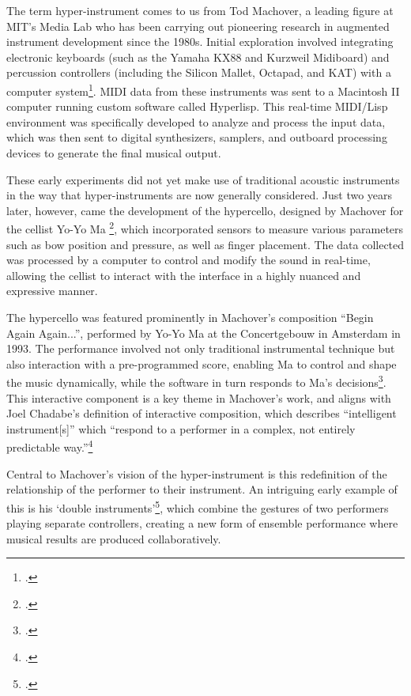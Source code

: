 \documentclass[12pt,twoside,maitrise]{dms_ks}
\theoremstyle{definition}
\begin{document}
{The term hyper-instrument comes to us from Tod Machover, a leading figure at MIT's Media Lab who has been carrying out pioneering research in augmented instrument development since the 1980s. 
Initial exploration involved integrating electronic keyboards (such as the Yamaha KX88 and Kurzweil Midiboard) and percussion controllers (including the Silicon Mallet, Octapad, and KAT) with a computer system\footcite[186]{machover_hyper-instruments_1989}. 
MIDI data from these instruments was sent to a Macintosh II computer running custom software called Hyperlisp.
This real-time MIDI/Lisp environment was specifically developed to analyze and process the input data, which was then sent to digital synthesizers, samplers, and outboard processing devices to generate the final musical output.

These early experiments did not yet make use of traditional acoustic instruments in the way that hyper-instruments are now generally considered. 
Just two years later, however, came the development of the hypercello, designed by Machover for the cellist Yo-Yo Ma \footcite[15]{levenson_taming_1994}, which incorporated sensors to measure various parameters such as bow position and pressure, as well as finger placement.
The data collected was processed by a computer to control and modify the sound in real-time, allowing the cellist to interact with the interface in a highly nuanced and expressive manner.

The hypercello was featured prominently in Machover's composition “Begin Again Again...”, performed by Yo-Yo Ma at the Concertgebouw in Amsterdam in 1993. 
The performance involved not only traditional instrumental technique but also interaction with a pre-programmed score, enabling Ma to control and shape the music dynamically, while the software in turn responds to Ma's decisions\footcite[16]{levenson_taming_1994}. 
This interactive component is a key theme in Machover's work, and aligns with Joel Chadabe's definition of interactive composition, which describes “intelligent instrument[s]” which “respond to a performer in a complex, not entirely predictable way.”\footcite[23]{chadabe_interactive_1984}

Central to Machover's vision of the hyper-instrument is this redefinition of the relationship of the performer to their instrument. 
An intriguing early example of this is his `double instruments'\footcite[189]{machover_hyper-instruments_1989}, which combine the gestures of two performers playing separate controllers, creating a new form of ensemble performance where musical results are produced collaboratively.

}
\end{document}
